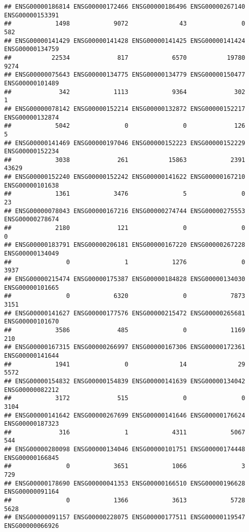 \documentclass[
]{article}
\begin{document}
\begin{verbatim}
## ENSG00000186814 ENSG00000172466 ENSG00000186496 ENSG00000267140 ENSG00000153391 
##            1498            9072              43               0             582 
## ENSG00000141429 ENSG00000141428 ENSG00000141425 ENSG00000141424 ENSG00000134759 
##           22534             817            6570           19780            9274 
## ENSG00000075643 ENSG00000134775 ENSG00000134779 ENSG00000150477 ENSG00000101489 
##             342            1113            9364             302               1 
## ENSG00000078142 ENSG00000152214 ENSG00000132872 ENSG00000152217 ENSG00000132874 
##            5042               0               0             126               5 
## ENSG00000141469 ENSG00000197046 ENSG00000152223 ENSG00000152229 ENSG00000152234 
##            3038             261           15863            2391           43629 
## ENSG00000152240 ENSG00000152242 ENSG00000141622 ENSG00000167210 ENSG00000101638 
##            1361            3476               5               0              23 
## ENSG00000078043 ENSG00000167216 ENSG00000274744 ENSG00000275553 ENSG00000278674 
##            2180             121               0               0               0 
## ENSG00000183791 ENSG00000206181 ENSG00000167220 ENSG00000267228 ENSG00000134049 
##               0               1            1276               0            3937 
## ENSG00000215474 ENSG00000175387 ENSG00000184828 ENSG00000134030 ENSG00000101665 
##               0            6320               0            7873            3151 
## ENSG00000141627 ENSG00000177576 ENSG00000215472 ENSG00000265681 ENSG00000101670 
##            3586             485               0            1169             210 
## ENSG00000167315 ENSG00000266997 ENSG00000167306 ENSG00000172361 ENSG00000141644 
##            1941               0              14              29            5572 
## ENSG00000154832 ENSG00000154839 ENSG00000141639 ENSG00000134042 ENSG00000082212 
##            3172             515               0               0            3104 
## ENSG00000141642 ENSG00000267699 ENSG00000141646 ENSG00000176624 ENSG00000187323 
##             316               1            4311            5067             544 
## ENSG00000280098 ENSG00000134046 ENSG00000101751 ENSG00000174448 ENSG00000166845 
##               0            3651            1066               3             729 
## ENSG00000178690 ENSG00000041353 ENSG00000166510 ENSG00000196628 ENSG00000091164 
##               0            1366            3613            5728            5628 
## ENSG00000091157 ENSG00000228075 ENSG00000177511 ENSG00000119547 ENSG00000066926 

\end{verbatim}
\end{document}
